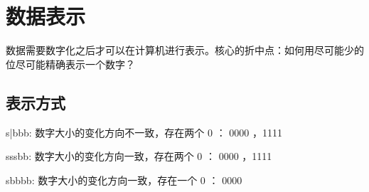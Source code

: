 \documentclass[cn,11pt,chinese,black,simple]{../elegantbook}
\begin{document}
\fi 
\def\chapname{01num}

\chapter{数据表示}

数据需要数字化之后才可以在计算机进行表示。核心的折中点：如何用尽可能少的位尽可能精确表示一个数字？

\section{表示方式}

\begin{definition}[原码]
    {s|bbb}: 数字大小的变化方向不一致，存在两个 0 ： 0000 ，1111
\end{definition}

\begin{definition}[反码]
    {sssbb}: 数字大小的变化方向一致，存在两个 0 ： 0000 ，1111
\end{definition}

\begin{definition}[补码]
    {sbbbb}: 数字大小的变化方向一致，存在一个 0 ： 0000
\end{definition}



\let\chapname\undefined
\ifx\mainclass\undefined
\end{document}
